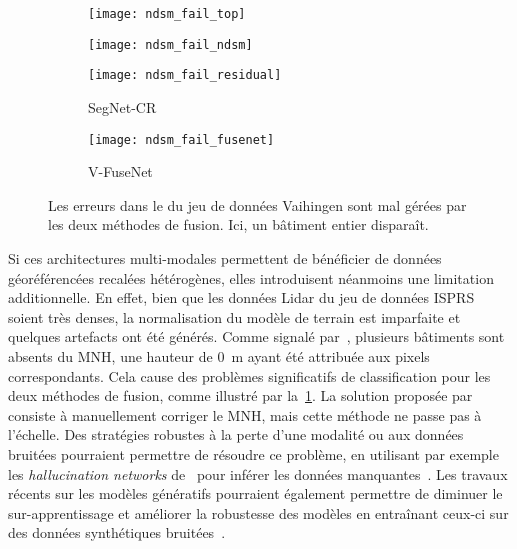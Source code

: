\begin{figure}[h]
	\captionsetup[subfigure]{singlelinecheck=off,justification=centering}
    \captionsetup[subfigure]{labelformat=empty}
    \begin{subfigure}{0.24\textwidth}
    	\texttt{[image: ndsm\_fail\_top]}
        \caption{}
    \end{subfigure}
    \begin{subfigure}{0.24\textwidth}
    	\texttt{[image: ndsm\_fail\_ndsm]}
        \caption{}
    \end{subfigure}
    \begin{subfigure}{0.24\textwidth}
    	\texttt{[image: ndsm\_fail\_residual]}
        \caption{SegNet-CR}
    \end{subfigure}
    \begin{subfigure}{0.24\textwidth}
    	\texttt{[image: ndsm\_fail\_fusenet]}
        \caption{V-FuseNet}
    \end{subfigure}
	\caption{Les erreurs dans le  du jeu de données  Vaihingen sont mal gérées par les deux méthodes de fusion. Ici, un bâtiment entier disparaît.}
    \label{fig:ndsm_fail}
\end{figure}

Si ces architectures multi-modales permettent de bénéficier de données géoréférencées recalées hétérogènes, elles introduisent néanmoins une limitation additionnelle. En effet, bien que les données \gls{Lidar} du jeu de données \gls{ISPRS} soient très denses, la normalisation du modèle de terrain est imparfaite et quelques artefacts ont été générés. Comme signalé par~\citet{marmanis_classification_2017}, plusieurs bâtiments sont absents du \gls{MNH}, une hauteur de \SI{0}{\meter} ayant été attribuée aux pixels correspondants. Cela cause des problèmes significatifs de classification pour les deux méthodes de fusion, comme illustré par la~\cref{fig:ndsm_fail}. La solution proposée par~\cite{marmanis_classification_2017} consiste à manuellement corriger le \gls{MNH}, mais cette méthode ne passe pas à l'échelle. Des stratégies robustes à la perte d'une modalité ou aux données bruitées pourraient permettre de résoudre ce problème, en utilisant par exemple les \emph{hallucination networks} de~\citet{hoffman_learning_2016} pour inférer les données manquantes~\cite{kampffmeyer_semantic_2016}. Les travaux récents sur les modèles génératifs pourraient également permettre de diminuer le sur-apprentissage et améliorer la robustesse des modèles en entraînant ceux-ci sur des données synthétiques bruitées~\cite{xie_adversarial_2017}.

